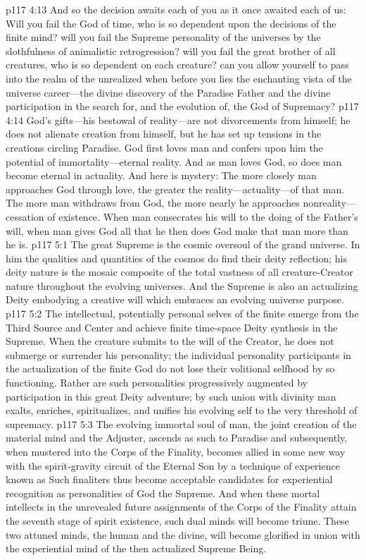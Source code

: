 \vs p117 4:13 And so the decision awaits each of you as it once awaited each of us: Will you fail the God of time, who is so dependent upon the decisions of the finite mind? will you fail the Supreme personality of the universes by the slothfulness of animalistic retrogression? will you fail the great brother of all creatures, who is so dependent on each creature? can you allow yourself to pass into the realm of the unrealized when before you lies the enchanting vista of the universe career---the divine discovery of the Paradise Father and the divine participation in the search for, and the evolution of, the God of Supremacy?
\pc \vs p117 4:14 God’s gifts---his bestowal of reality---are not divorcements from himself; he does not alienate creation from himself, but he has set up tensions in the creations circling Paradise. God first loves man and confers upon him the potential of immortality---eternal reality. And as man loves God, so does man become eternal in actuality. And here is mystery: The more closely man approaches God through love, the greater the reality---actuality---of that man. The more man withdraws from God, the more nearly he approaches nonreality---cessation of existence. When man consecrates his will to the doing of the Father’s will, when man gives God all that he  then does God make that man more than he is.
\vs p117 5:1 The great Supreme is the cosmic oversoul of the grand universe. In him the qualities and quantities of the cosmos do find their deity reflection; his deity nature is the mosaic composite of the total vastness of all creature\hyp{}Creator nature throughout the evolving universes. And the Supreme is also an actualizing Deity embodying a creative will which embraces an evolving universe purpose.
\vs p117 5:2 The intellectual, potentially personal selves of the finite emerge from the Third Source and Center and achieve finite time\hyp{}space Deity synthesis in the Supreme. When the creature submits to the will of the Creator, he does not submerge or surrender his personality; the individual personality participants in the actualization of the finite God do not lose their volitional selfhood by so functioning. Rather are such personalities progressively augmented by participation in this great Deity adventure; by such union with divinity man exalts, enriches, spiritualizes, and unifies his evolving self to the very threshold of supremacy.
\pc \vs p117 5:3 The evolving immortal soul of man, the joint creation of the material mind and the Adjuster, ascends as such to Paradise and subsequently, when mustered into the Corps of the Finality, becomes allied in some new way with the spirit\hyp{}gravity circuit of the Eternal Son by a technique of experience known as  Such finaliters thus become acceptable candidates for experiential recognition as personalities of God the Supreme. And when these mortal intellects in the unrevealed future assignments of the Corps of the Finality attain the seventh stage of spirit existence, such dual minds will become triune. These two attuned minds, the human and the divine, will become glorified in union with the experiential mind of the then actualized Supreme Being.
